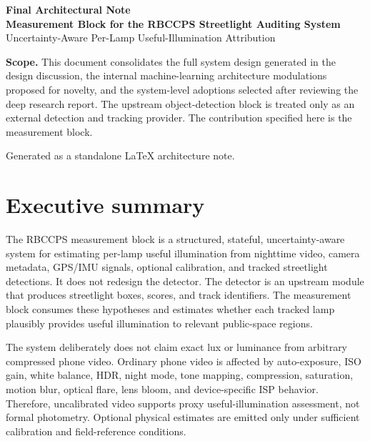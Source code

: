 \documentclass[11pt]{article}
\begin{document}
\begin{titlepage}
\centering
\vspace*{1.4cm}
{\LARGE\bfseries Final Architectural Note\\[0.25em]}
{\Large\bfseries Measurement Block for the RBCCPS Streetlight Auditing System\\[0.9em]}
{\large Uncertainty-Aware Per-Lamp Useful-Illumination Attribution\\[1.4em]}
\vfill
\begin{minipage}{0.84\textwidth}
\small
\textbf{Scope.} This document consolidates the full system design generated in the design discussion, the internal machine-learning architecture modulations proposed for novelty, and the system-level adoptions selected after reviewing the deep research report. The upstream object-detection block is treated only as an external detection and tracking provider. The contribution specified here is the measurement block.
\end{minipage}
\vfill
{\small Generated as a standalone LaTeX architecture note.}
\end{titlepage}

\tableofcontents
\newpage
{}

\section{Executive summary}

The RBCCPS measurement block is a structured, stateful, uncertainty-aware system for estimating per-lamp useful illumination from nighttime video, camera metadata, GPS/IMU signals, optional calibration, and tracked streetlight detections. It does not redesign the detector. The detector is an upstream module that produces streetlight boxes, scores, and track identifiers. The measurement block consumes these hypotheses and estimates whether each tracked lamp plausibly provides useful illumination to relevant public-space regions.

The system deliberately does not claim exact lux or luminance from arbitrary compressed phone video. Ordinary phone video is affected by auto-exposure, ISO gain, white balance, HDR, night mode, tone mapping, compression, saturation, motion blur, optical flare, lens bloom, and device-specific ISP behavior. Therefore, uncalibrated video supports proxy useful-illumination assessment, not formal photometry. Optional physical estimates are emitted only under sufficient calibration and field-reference conditions.
\end{document}
